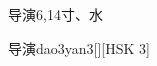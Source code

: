 \begin{entry}{导演}{6,14}{⼨、⽔}
  \begin{phonetics}{导演}{dao3yan3}[][HSK 3]
  \end{phonetics}
\end{entry}
